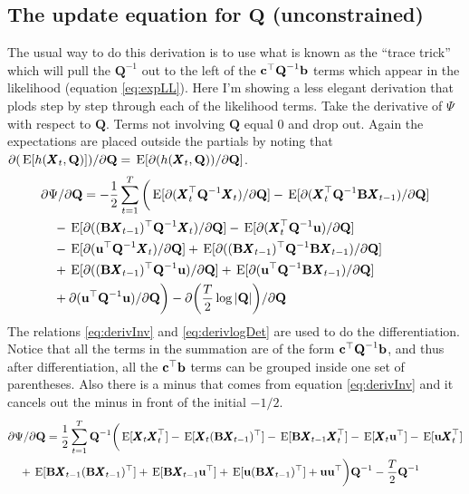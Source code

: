 \documentclass[]{article}
\def\BB{\mbox{$\mathbf B$}}	\def\bb{\mbox{$\mathbf b$}}
\def\QQ{\mbox{$\mathbf Q$}}	 \def\qq{\mbox{$\mathbf q$}}
\def\XX{\mbox{$\pmb{X}$}}	\def\xx{\mbox{$\pmb{x}$}}
\def\E{\,\textup{\textrm{E}}}
\begin{document}
\subsection{The update equation for $\QQ$ (unconstrained)}
\label{subsec:Qunconstrained}
The usual way to do this derivation is to use what is known as the ``trace trick'' which will pull the $\QQ^{-1}$ out to the left of the $\cc^\top\QQ^{-1}\bb$ terms which appear in the likelihood (equation \ref{eq:expLL}).  Here I'm showing a less elegant derivation that plods step by step through each of the likelihood terms.  Take the derivative of $\Psi$ with respect to $\QQ$. Terms not involving $\QQ$ equal 0 and drop out.   Again the expectations are placed outside the partials by noting that $\partial(\E[h(\XX_t,\QQ)])/\partial\QQ=\E[\partial(h(\XX_t,\QQ))/\partial\QQ]$. 
\begin{equation}\label{eq:Q.unconstrained1}
\begin{split}
&\partial\Psi/\partial\QQ = -\frac{1}{2} \sum_{t=1}^T\bigg(
\E[\partial(\XX_t^\top\QQ^{-1}\XX_t)/\partial\QQ]
-\E[\partial(\XX_t^\top\QQ^{-1}\BB\XX_{t-1})/\partial\QQ] \\
&\quad -\E[\partial((\BB\XX_{t-1})^\top\QQ^{-1}\XX_t)/\partial\QQ ]
 - \E[\partial(\XX_t^\top\QQ^{-1}\uu)/\partial\QQ] \\
&\quad - \E[\partial(\uu^\top\QQ^{-1}\XX_t)/\partial\QQ] 
+ \E[\partial((\BB\XX_{t-1})^\top\QQ^{-1}\BB\XX_{t-1})/\partial\QQ] \\
&\quad + \E[\partial((\BB\XX_{t-1})^\top\QQ^{-1}\uu)/\partial\QQ] 
+ \E[\partial(\uu^\top\QQ^{-1}\BB\XX_{t-1})/\partial\QQ]\\
&\quad +\partial(\uu^\top\QQ^{-1}\uu)/\partial\QQ
\bigg) - \partial\bigg(\frac{T}{2}\log |\QQ| \bigg)/\partial\QQ \\
\end{split}
\end{equation}
The relations \eqref{eq:derivInv} and \eqref{eq:derivlogDet} are used to do the differentiation. Notice that all the terms in the summation are of the form $\cc^\top\QQ^{-1}\bb$, and thus after differentiation, all the $\cc^\top\bb$ terms can be grouped inside one set of parentheses.  Also there is a minus that comes from equation \ref{eq:derivInv} and it cancels out the minus in front of the initial $-1/2$.
\begin{equation}\label{eq:Q.unconstrained2}
\begin{split}
&\partial\Psi/\partial\QQ = \frac{1}{2} \sum_{t=1}^T \QQ^{-1} \bigg( 
 \E[\XX_t\XX_t^\top] -\E[\XX_t(\BB\XX_{t-1})^\top ] - \E[\BB\XX_{t-1}\XX_t^\top ]  - \E[ \XX_t\uu^\top ] - \E[ \uu\XX_t^\top ] \\
&\quad + \E[ \BB\XX_{t-1}(\BB\XX_{t-1})^\top ] + \E[\BB\XX_{t-1}\uu^\top] + \E[ \uu(\BB\XX_{t-1})^\top ] + \uu\uu^\top \bigg)\QQ^{-1} - \frac{T}{2}\QQ^{-1} 
\end{split}
\end{equation}
\end{document}
